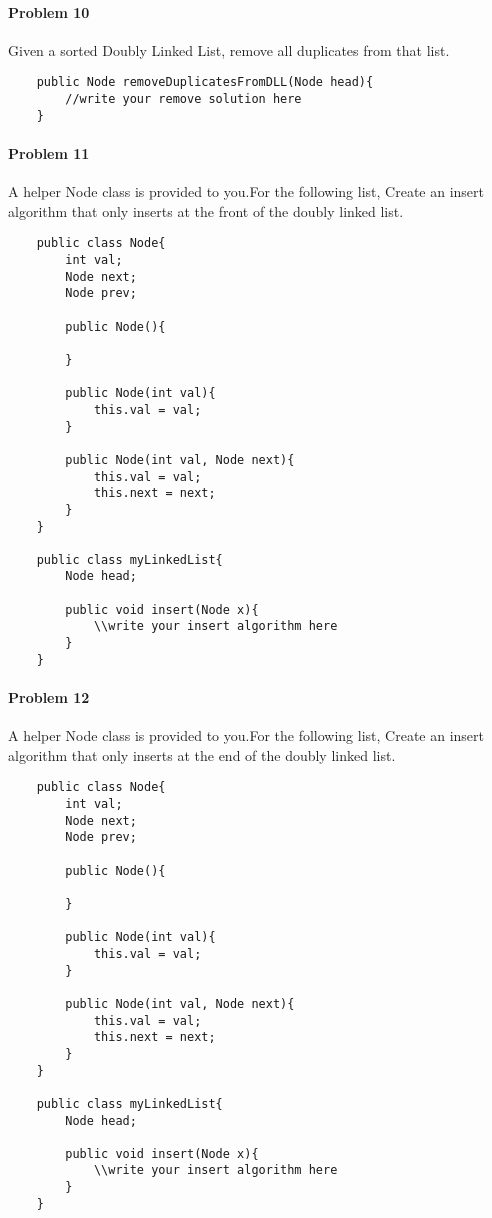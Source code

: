 \documentclass[letterpaper]{article}
\begin{document}
\paragraph{Problem 10} Given a sorted Doubly Linked List, remove all duplicates from that list.

\begin{verbatim}
    public Node removeDuplicatesFromDLL(Node head){
        //write your remove solution here
    }
\end{verbatim}

\paragraph{Problem 11} A helper Node class is provided to you.For the following list, Create an insert algorithm that only inserts at the front of the doubly linked list.

\begin{verbatim}
    public class Node{
        int val;
        Node next;
        Node prev;
        
        public Node(){
        
        }
        
        public Node(int val){
            this.val = val;   
        }
        
        public Node(int val, Node next){
            this.val = val;
            this.next = next; 
        }
    }    
	
    public class myLinkedList{
        Node head; 
		
        public void insert(Node x){
            \\write your insert algorithm here
        }
    }
\end{verbatim} 

\paragraph{Problem 12} A helper Node class is provided to you.For the following list, Create an insert algorithm that only inserts at the end of the doubly linked list.

\begin{verbatim}
    public class Node{
        int val;
        Node next;
        Node prev;
        
        public Node(){
        
        }
        
        public Node(int val){
            this.val = val;   
        }
		
        public Node(int val, Node next){
        	this.val = val;
        	this.next = next; 
        }
    }    
    
    public class myLinkedList{
        Node head; 
        
        public void insert(Node x){
            \\write your insert algorithm here
        }
    }
\end{verbatim}
\end{document}
